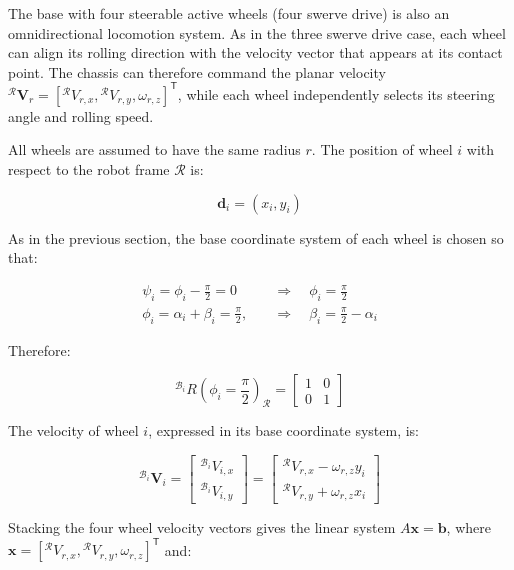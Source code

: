 \documentclass[11pt,a4paper]{article}
\newcommand{\vect}[1]{\bm{#1}}       %
\newcommand{\trans}{\mathsf{T}}      %
\newcommand{\frameR}{\mathcal{R}}
\newcommand{\frameBi}{\mathcal{B}_i}
\begin{document}
The base with four steerable active wheels (four swerve drive) is also an
omnidirectional locomotion system. As in the three swerve drive case, each
wheel can align its rolling direction with the velocity vector that appears at
its contact point. The chassis can therefore command the planar velocity
\({}^{\frameR}\vect{V}_r = [{}^{\frameR}V_{r,x}, {}^{\frameR}V_{r,y},
\omega_{r,z}]^{\trans}\), while each wheel independently selects its steering
angle and rolling speed.

All wheels are assumed to have the same radius \(r\). The position of wheel
\(i\) with respect to the robot frame \(\frameR\) is:

\begin{equation}
    \vect{d}_i = (x_i, y_i)
\end{equation}

As in the previous section, the base coordinate system of each wheel is chosen
so that:

\[
    \begin{aligned}
        \psi_i = \phi_i - \frac{\pi}{2} = 0 \quad          & \Longrightarrow \quad \phi_i = \frac{\pi}{2}             \\
        \phi_i = \alpha_i + \beta_i = \frac{\pi}{2}, \quad & \Longrightarrow \quad \beta_i = \frac{\pi}{2} - \alpha_i
    \end{aligned}
\]

Therefore:

\[
    {}^{\frameBi} R\left(\phi_i = \frac{\pi}{2}\right)_{\frameR} =
    \begin{bmatrix}
        1 & 0 \\
        0 & 1
    \end{bmatrix}
\]

The velocity of wheel \(i\), expressed in its base coordinate system, is:

\begin{equation}
    {}^{\frameBi}\vect{V}_i =
    \begin{bmatrix}
        {}^{\frameBi}V_{i,x} \\
        {}^{\frameBi}V_{i,y}
    \end{bmatrix}
    =
    \begin{bmatrix}
        {}^{\frameR}V_{r,x} - \omega_{r,z}y_i \\
        {}^{\frameR}V_{r,y} + \omega_{r,z}x_i
    \end{bmatrix}
\end{equation}

Stacking the four wheel velocity vectors gives the linear system
\(A\mathbf{x} = \mathbf{b}\), where
\(\mathbf{x} = [{}^{\frameR}V_{r,x}, {}^{\frameR}V_{r,y},
\omega_{r,z}]^{\trans}\) and:
\end{document}
